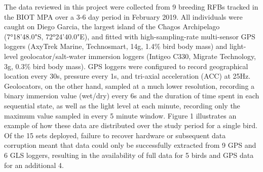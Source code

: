 \documentclass[11pt]{article}
\begin{document}
    The data reviewed in this project were collected from 9 breeding RFBs tracked in the BIOT MPA over a 3-6 day period in February 2019. All individuals were caught on Diego Garcia, the largest island of the Chagos Archipelago (7°18'48.0"S, 72°24'40.0"E), and fitted with high-sampling-rate multi-sensor GPS loggers (AxyTrek Marine, Technosmart, 14g, 1.4\% bird body mass) and light-level geolocator/salt-water immersion loggers (Intigeo C330, Migrate Technology, 3g, 0.3\% bird body mass). GPS loggers were configured to record geographical location every 30s, pressure every 1s, and tri-axial acceleration (ACC) at 25Hz. Geolocators, on the other hand, sampled at a much lower resolution, recording a binary immersion value (wet/dry) every 6s and the duration of time spent in each sequential state, as well as the light level at each minute, recording only the maximum value sampled in every 5 minute window. Figure 1 illustrates an example of how these data are distributed over the study period for a single bird. Of the 15 sets deployed, failure to recover hardware or subsequent data corruption meant that data could only be successfully extracted from 9 GPS and 6 GLS loggers, resulting in the availability of full data for 5 birds and GPS data for an additional 4.
    
\end{document}
